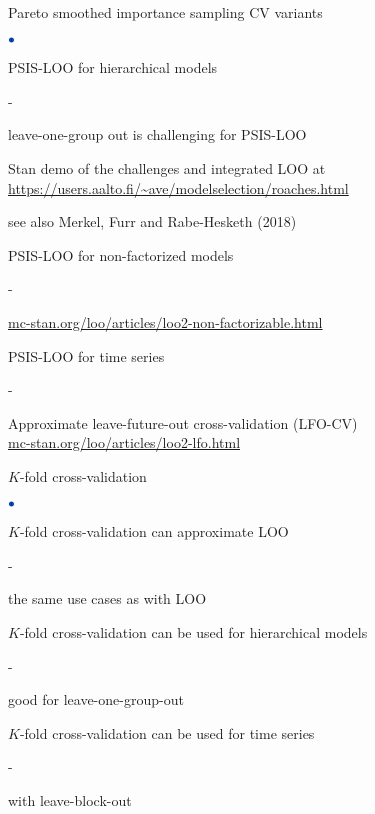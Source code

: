 \documentclass[english,t]{beamer}
\newenvironment{list1}{
   \begin{list}{$\color{list1}\bullet$}{\itemsep=6pt}}{
  \end{list}}
\newenvironment{list2}{
  \begin{list}{-}{\baselineskip=12pt\itemsep=2pt}}{
  \end{list}}
\begin{document}
\begin{frame}{Pareto smoothed importance sampling CV variants}

\begin{list1}
\item PSIS-LOO for hierarchical models
  \begin{list2}
  \item leave-one-group out is challenging for PSIS-LOO\\ \vspace{0.2\baselineskip}
    
  \item Stan demo of the challenges and integrated LOO at \url{https://users.aalto.fi/~ave/modelselection/roaches.html}
  \item {\small see also Merkel, Furr and Rabe-Hesketh (2018)}
  \end{list2}
  \item<2-> PSIS-LOO for non-factorized models
    \begin{list2}
    \item {\url{mc-stan.org/loo/articles/loo2-non-factorizable.html}}
    \end{list2}
  \item<3-> PSIS-LOO for time series
  \begin{list2}
  \item Approximate leave-future-out cross-validation (LFO-CV) \\ \vspace{0.2\baselineskip}
    {\url{mc-stan.org/loo/articles/loo2-lfo.html}}
  \end{list2}
\end{list1}

\end{frame}


\begin{frame}{$K$-fold cross-validation}

\begin{list1}
\item $K$-fold cross-validation can approximate LOO
  \begin{list2}
    \item the same use cases as with LOO
  \end{list2}
\item $K$-fold cross-validation can be used for hierarchical models
  \begin{list2}
    \item good for leave-one-group-out
  \end{list2}
\item $K$-fold cross-validation can be used for time series
  \begin{list2}
    \item with leave-block-out
  \end{list2}
\end{list1}

\end{frame}
\end{document}
